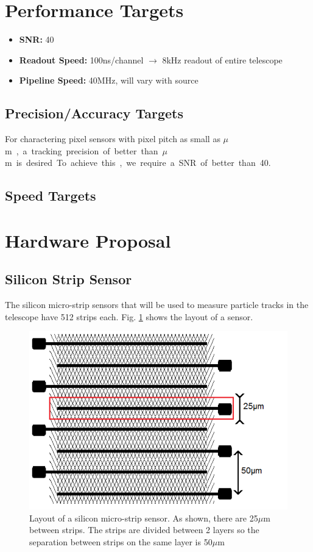 \documentclass{article}
\newcommand{\itemt}[1]{\item \textbf{#1}}
\newcommand{\um}{$\mu$m}
\begin{document}
\section{Performance Targets}

\begin{itemize}
  \itemt{\gls{SNR}:} 40
  \itemt{Readout Speed:} 100ns/channel $\rightarrow$ 8kHz readout of entire telescope
  \itemt{Pipeline Speed:} 40MHz, will vary with source
\end{itemize}


\subsection{Precision/Accuracy Targets}
\label{sec:PerformanceTargets}
For charactering pixel sensors with pixel pitch as small as \unit[25]{\um}, a tracking precision of better than \unit[1]{\um} is desired. To achieve this, we require a \gls{SNR} of better than 40.
\subsection{Speed Targets}

\section{Hardware Proposal}

\subsection{Silicon Strip Sensor}
The silicon micro-strip sensors that will be used to measure particle tracks in the telescope have 512 strips each. Fig. \ref{fig:Microstrip_Sensor} shows the layout of a sensor.

\begin{figure}[h]
  \centering
  \includegraphics{./figures/Microstrip_Sensor.png}
  \caption{Layout of a silicon micro-strip sensor. As shown, there are 25$\mu$m between strips. The strips are divided between 2 layers so the separation between strips on the same layer is 50$\mu$m}
  \label{fig:Microstrip_Sensor}
\end{figure}
\end{document}
